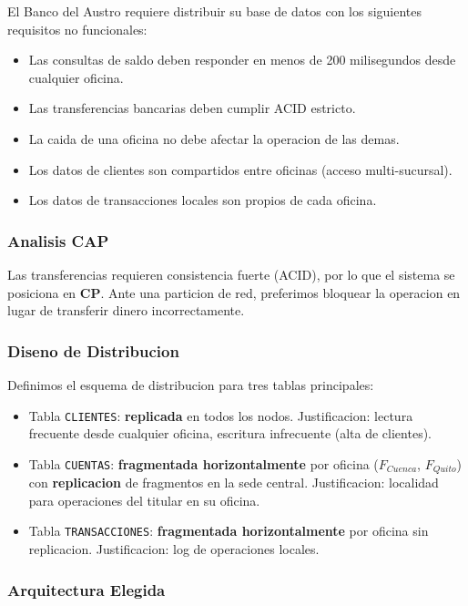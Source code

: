 \documentclass[11pt,a4paper]{article}
\begin{document}
El Banco del Austro requiere distribuir su base de datos con los siguientes requisitos no funcionales:

\begin{itemize}[leftmargin=*]
\item Las consultas de saldo deben responder en menos de 200 milisegundos desde cualquier oficina.
\item Las transferencias bancarias deben cumplir ACID estricto.
\item La caida de una oficina no debe afectar la operacion de las demas.
\item Los datos de clientes son compartidos entre oficinas (acceso multi-sucursal).
\item Los datos de transacciones locales son propios de cada oficina.
\end{itemize}

\subsubsection{Analisis CAP}

Las transferencias requieren consistencia fuerte (ACID), por lo que el sistema se posiciona en \textbf{CP}. Ante una particion de red, preferimos bloquear la operacion en lugar de transferir dinero incorrectamente.

\subsubsection{Diseno de Distribucion}

Definimos el esquema de distribucion para tres tablas principales:

\begin{itemize}[leftmargin=*]
\item Tabla \texttt{CLIENTES}: \textbf{replicada} en todos los nodos. Justificacion: lectura frecuente desde cualquier oficina, escritura infrecuente (alta de clientes).
\item Tabla \texttt{CUENTAS}: \textbf{fragmentada horizontalmente} por oficina ($F_{Cuenca}$, $F_{Quito}$) con \textbf{replicacion} de fragmentos en la sede central. Justificacion: localidad para operaciones del titular en su oficina.
\item Tabla \texttt{TRANSACCIONES}: \textbf{fragmentada horizontalmente} por oficina sin replicacion. Justificacion: log de operaciones locales.
\end{itemize}

\subsubsection{Arquitectura Elegida}
\end{document}
